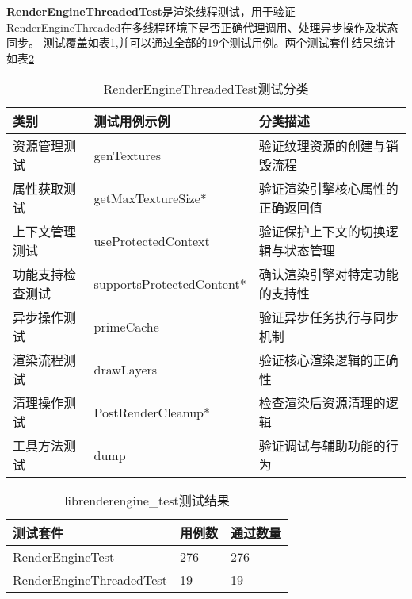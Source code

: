 \textbf{RenderEngineThreadedTest}是渲染线程测试，用于验证RenderEngineThreaded在多线程环境下是否正确代理调用、处理异步操作及状态同步。
测试覆盖如表\ref{tab:RenderEngineThreadedTest测试分类},并可以通过全部的19个测试用例。两个测试套件结果统计如表\ref{tab:librenderengine_test测试结果}

\begin{table}[h]
    \centering
    \caption{RenderEngineThreadedTest测试分类}
    \label{tab:RenderEngineThreadedTest测试分类}
    \begin{tabular}{lll}
      \toprule
      类别 & 测试用例示例 & 分类描述 \\
      \midrule
      资源管理测试 & genTextures & 验证纹理资源的创建与销毁流程 \\
      属性获取测试 & getMaxTextureSize* & 验证渲染引擎核心属性的正确返回值 \\
      上下文管理测试 & useProtectedContext & 验证保护上下文的切换逻辑与状态管理 \\
      功能支持检查测试 & supportsProtectedContent* & 确认渲染引擎对特定功能的支持性 \\
      异步操作测试 & primeCache & 验证异步任务执行与同步机制 \\
      渲染流程测试 & drawLayers & 验证核心渲染逻辑的正确性 \\
      清理操作测试 & PostRenderCleanup* & 检查渲染后资源清理的逻辑 \\
      工具方法测试 & dump & 验证调试与辅助功能的行为 \\
      \bottomrule
    \end{tabular}
    \note{}
\end{table}

\begin{table}[h]
    \centering
    \caption{librenderengine\_test测试结果}
    \label{tab:librenderengine_test测试结果}
    \begin{tabular}{lll}
      \toprule
      测试套件 & 用例数 & 通过数量 \\
      \midrule
      RenderEngineTest & 276 & 276 \\
      RenderEngineThreadedTest & 19 & 19 \\
      \bottomrule
    \end{tabular}
    \note{}
\end{table}

